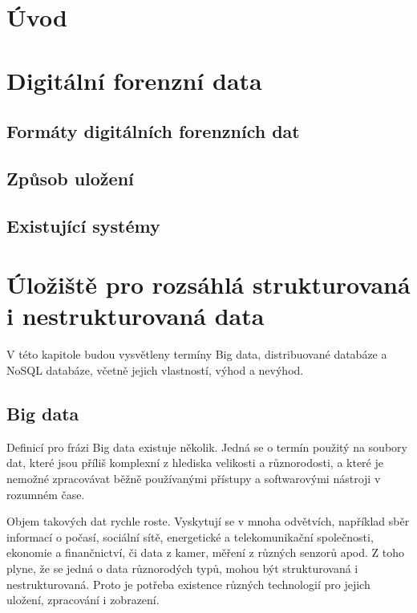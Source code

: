 

\chapter{Úvod}

\chapter{Digitální forenzní data}
\section{Formáty digitálních forenzních dat}
\section{Způsob uložení}
\section{Existující systémy}

\chapter{Úložiště pro rozsáhlá strukturovaná i nestrukturovaná data}
V této kapitole budou vysvětleny termíny Big data, distribuované databáze a NoSQL databáze, včetně jejich vlastností, výhod a nevýhod.

\section{Big data}
Definicí pro frázi Big data existuje několik. Jedná se o termín použitý na soubory dat, které jsou příliš komplexní z hlediska velikosti a různorodosti, a které je nemožné zpracovávat běžně používanými přístupy a softwarovými nástroji v rozumném čase.

Objem takových dat rychle roste. Vyskytují se v mnoha odvětvích, například sběr informací o počasí, sociální sítě, energetické a telekomunikační společnosti, ekonomie a finančnictví, či data z kamer, měření z různých senzorů apod. Z toho plyne, že se jedná o data různorodých typů, mohou být strukturovaná i nestrukturovaná. Proto je potřeba existence různých technologií pro jejich uložení, zpracování i zobrazení.

